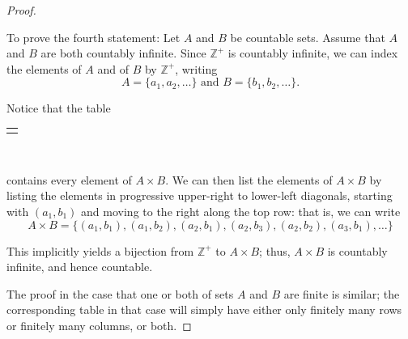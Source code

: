\documentclass[10pt,]{book}
\theoremstyle{plain}
\theoremstyle{definition}
\theoremstyle{definition}
\theoremstyle{definition}
\theoremstyle{definition}
\numberwithin{equation}{section}
\newlength{\panelmax}
\def\Z{\mathbb{Z}}
\begin{document}
\begin{proof}\hypertarget{proof-4}{}
To prove the fourth statement: Let \(A\) and \(B\) be countable sets. Assume that \(A\) and \(B\) are both countably infinite. Since \(\Z^+\) is countably infinite, we can index the elements of \(A\) and of \(B\) by \(\Z^+\), writing%
\begin{equation*}
A=\{a_1,a_2,\ldots\} \text{ and }  B=\{b_1,b_2,\ldots\}.
\end{equation*}
%
\par
Notice that the table%
{%
\setlength{\panelmax}{0pt}
\newsavebox{\panelboxBtabular}
\newlength{\phBtabular}\setlength{\phBtabular}{\ht\panelboxBtabular+\dp\panelboxBtabular}
\settototalheight{\phBtabular}{\usebox{\panelboxBtabular}}
\setlength{\panelmax}{\maxof{\panelmax}{\phBtabular}}
\leavevmode%
\setlength{\tabcolsep}{0\textwidth}
\par\medskip\noindent
\begin{tabular}{@{}*{1}{c}@{}}
\begin{minipage}[c][\panelmax][t]{1\textwidth}\usebox{\panelboxBtabular}\end{minipage}\end{tabular}\\
}%
\par
contains every element of \(A\times B\). We can then list the elements of \(A\times B\) by listing the elements in progressive upper-right to lower-left diagonals, starting with \((a_1,b_1)\) and moving to the right along the top row: that is, we can write%
\begin{equation*}
A\times B=\{(a_1,b_1),(a_1,b_2),(a_2,b_1),(a_2,b_3),(a_2,b_2),(a_3,b_1),\ldots\}
\end{equation*}
%
\par
This implicitly yields a bijection from \(\Z^+\) to \(A\times B\); thus, \(A\times B\) is countably infinite, and hence countable.%
\par
The proof in the case that one or both of sets \(A\) and \(B\) are finite is similar; the corresponding table in that case will simply have either only finitely many rows or finitely many columns, or both.%
\end{proof}
\end{document}
